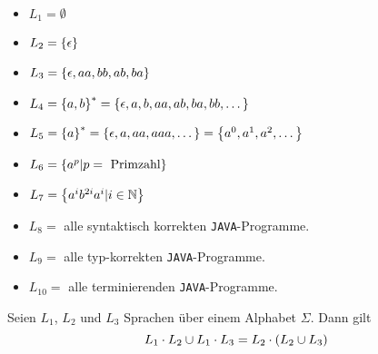 \begin{example}~
\begin{itemize}
\item $L_1 = \emptyset$
\item $L_2 = \left\{\epsilon\right\}$
\item $L_3 = \left\{\epsilon, aa, bb, ab, ba\right\}$
\item $L_4 = \left\{a, b\right\}^* = \left\{\epsilon, a, b, aa, ab, ba, bb, \dots\right\}$
\item $L_5 = \left\{a\right\}^* = \left\{\epsilon, a, aa, aaa, \dots\right\} = \left\{a^0, a^1, a^2, \dots\right\}$
\item $L_6 = \left\{a^p \vert p = \text{ Primzahl}\right\}$
\item $L_7 = \left\{a^i b^{2i} a^i \vert i \in \mathbb{N}\right\}$
\item $L_8 =$ alle syntaktisch korrekten \lstinline!JAVA!-Programme.
\item $L_9 =$ alle typ-korrekten \lstinline!JAVA!-Programme.
\item $L_{10} =$ alle terminierenden \lstinline!JAVA!-Programme.
\end{itemize}
\end{example}

\begin{lemma}
Seien $L_1$, $L_2$ und $L_3$ Sprachen über einem Alphabet $\Sigma$. Dann gilt
\[L_1 \cdot L_2 \cup L_1 \cdot L_3 = L_2 \cdot \left(L_2 \cup L_3\right)\]
\label{lem:Sprachen_Lemma_1}
\end{lemma}

